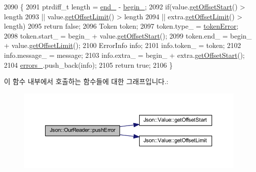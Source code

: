 \begin{DoxyCode}
2090                                                                                                \{
2091   ptrdiff\_t length = \hyperlink{class_json_1_1_our_reader_ab1f69b0260c27a0d2d65dc56e42c8f9d}{end\_} - \hyperlink{class_json_1_1_our_reader_a9bda9d72335d52cd06e65f9eca3f70f5}{begin\_};
2092   \textcolor{keywordflow}{if}(value.\hyperlink{class_json_1_1_value_afa081dc764000951a1d8d6148155508e}{getOffsetStart}() > length
2093     || value.\hyperlink{class_json_1_1_value_a2cdfa01935f87fcace90d450cbd2c0a4}{getOffsetLimit}() > length
2094     || extra.\hyperlink{class_json_1_1_value_a2cdfa01935f87fcace90d450cbd2c0a4}{getOffsetLimit}() > length)
2095     \textcolor{keywordflow}{return} \textcolor{keyword}{false};
2096   Token token;
2097   token.type\_ = \hyperlink{class_json_1_1_our_reader_a15116f7276ddf1e7a2cc3cbefa884dccad39f929b971de8dc55fe84a2d2e3465e}{tokenError};
2098   token.start\_ = begin\_ + value.\hyperlink{class_json_1_1_value_afa081dc764000951a1d8d6148155508e}{getOffsetStart}();
2099   token.end\_ = begin\_ + value.\hyperlink{class_json_1_1_value_a2cdfa01935f87fcace90d450cbd2c0a4}{getOffsetLimit}();
2100   ErrorInfo info;
2101   info.token\_ = token;
2102   info.message\_ = message;
2103   info.extra\_ = begin\_ + extra.\hyperlink{class_json_1_1_value_afa081dc764000951a1d8d6148155508e}{getOffsetStart}();
2104   \hyperlink{class_json_1_1_our_reader_afb76b68ba1ab68fe09cf2838e3d4898d}{errors\_}.push\_back(info);
2105   \textcolor{keywordflow}{return} \textcolor{keyword}{true};
2106 \}
\end{DoxyCode}
이 함수 내부에서 호출하는 함수들에 대한 그래프입니다.\+:\nopagebreak
\begin{figure}[H]
\begin{center}
\leavevmode
\includegraphics[width=350pt]{class_json_1_1_our_reader_addccecfca74b79adaad6115ddd614477_cgraph}
\end{center}
\end{figure}
\mbox{\label{class_json_1_1_our_reader_a0b9f58faf4212c6ecb5d8e2a1ac10257}} 
